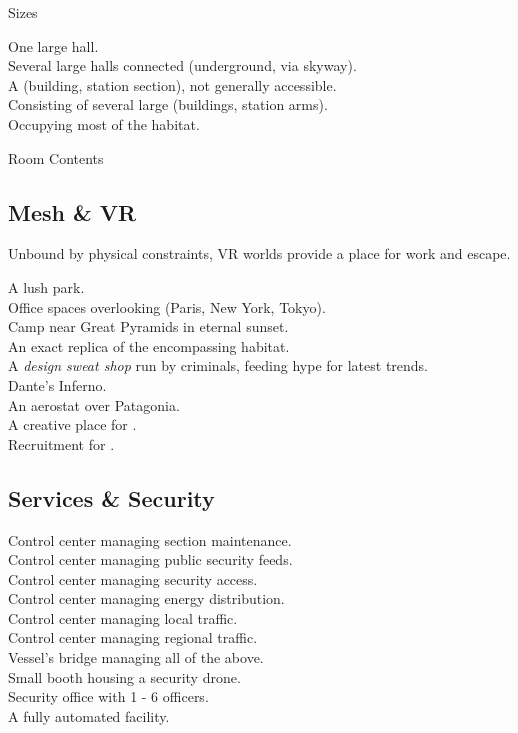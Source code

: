 \documentclass[a4]{article}
\begin{document}
Sizes

\starttableone
One large hall.\\
Several large halls connected (underground, via skyway).\\
A (building, station section), not generally accessible.\\
Consisting of several large (buildings, station arms).\\
Occupying most of the habitat.\\
\stoptableone



Room Contents

\starttableone
\stoptableone



\subsection{Mesh \& VR}

Unbound by physical constraints, VR worlds provide a place for work and escape.

\starttableone
A lush park.\\
Office spaces overlooking (Paris, New York, Tokyo).\\
Camp near Great Pyramids in eternal sunset.\\
An exact replica of the encompassing habitat.\\
A \textit{design sweat shop} run by criminals, feeding hype for latest trends.\\
Dante's Inferno.\\
An aerostat over Patagonia.\\
A creative place for .\\
Recruitment for .\\
\stoptableone


\starttableone
\stoptableone



\subsection{Services \& Security}

\starttableone
Control center managing section maintenance.\\
Control center managing public security feeds.\\
Control center managing security access.\\
Control center managing energy distribution.\\
Control center managing local traffic.\\
Control center managing regional traffic.\\
Vessel's bridge managing all of the above.\\
Small booth housing a security drone.\\
Security office with 1 - 6 officers.\\
A fully automated  facility.\\
\end{document}
